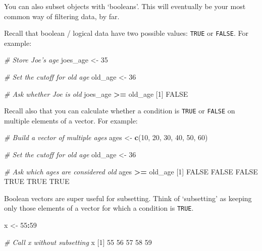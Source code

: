 \documentclass[]{book}
\newenvironment{Shaded}{\begin{snugshade}}{\end{snugshade}}
\newcommand{\CommentTok}[1]{\textcolor[rgb]{0.56,0.35,0.01}{\textit{#1}}}
\newcommand{\DecValTok}[1]{\textcolor[rgb]{0.00,0.00,0.81}{#1}}
\newcommand{\KeywordTok}[1]{\textcolor[rgb]{0.13,0.29,0.53}{\textbf{#1}}}
\newcommand{\NormalTok}[1]{#1}
\newcommand{\OperatorTok}[1]{\textcolor[rgb]{0.81,0.36,0.00}{\textbf{#1}}}
\newcommand{\OtherTok}[1]{\textcolor[rgb]{0.56,0.35,0.01}{#1}}
\newcommand{\StringTok}[1]{\textcolor[rgb]{0.31,0.60,0.02}{#1}}
\begin{document}
You can also subset objects with `booleans'. This will eventually be your most common way of filtering data, by far.

Recall that boolean / logical data have two possible values: \texttt{TRUE} or \texttt{FALSE}. For example:

\begin{Shaded}
\begin{Highlighting}[]
\CommentTok{# Store Joe's age}
\NormalTok{joes_age <-}\StringTok{ }\DecValTok{35}

\CommentTok{# Set the cutoff for old age}
\NormalTok{old_age <-}\StringTok{ }\DecValTok{36}

\CommentTok{# Ask whether Joe is old}
\NormalTok{joes_age }\OperatorTok{>=}\StringTok{ }\NormalTok{old_age}
\NormalTok{[}\DecValTok{1}\NormalTok{] }\OtherTok{FALSE}
\end{Highlighting}
\end{Shaded}

Recall also that you can calculate whether a condition is \texttt{TRUE} or \texttt{FALSE} on multiple elements of a vector. For example:

\begin{Shaded}
\begin{Highlighting}[]
\CommentTok{# Build a vector of multiple ages}
\NormalTok{ages <-}\StringTok{ }\KeywordTok{c}\NormalTok{(}\DecValTok{10}\NormalTok{, }\DecValTok{20}\NormalTok{, }\DecValTok{30}\NormalTok{, }\DecValTok{40}\NormalTok{, }\DecValTok{50}\NormalTok{, }\DecValTok{60}\NormalTok{)}

\CommentTok{# Set the cutoff for old age}
\NormalTok{old_age <-}\StringTok{ }\DecValTok{36}

\CommentTok{# Ask which ages are considered old}
\NormalTok{ages }\OperatorTok{>=}\StringTok{ }\NormalTok{old_age}
\NormalTok{[}\DecValTok{1}\NormalTok{] }\OtherTok{FALSE} \OtherTok{FALSE} \OtherTok{FALSE}  \OtherTok{TRUE}  \OtherTok{TRUE}  \OtherTok{TRUE}
\end{Highlighting}
\end{Shaded}

Boolean vectors are super useful for subsetting. Think of `subsetting' as keeping only those elements of a vector for which a condition is \texttt{TRUE}.

\begin{Shaded}
\begin{Highlighting}[]
\NormalTok{x <-}\StringTok{ }\DecValTok{55}\OperatorTok{:}\DecValTok{59}

\CommentTok{# Call x without subsetting}
\NormalTok{x}
\NormalTok{[}\DecValTok{1}\NormalTok{] }\DecValTok{55} \DecValTok{56} \DecValTok{57} \DecValTok{58} \DecValTok{59}
\end{Highlighting}
\end{Shaded}
\end{document}

